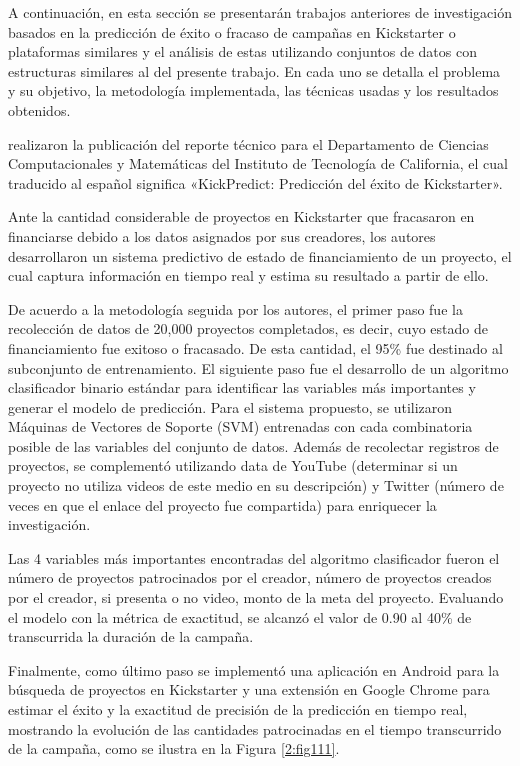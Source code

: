 A continuación, en esta sección se presentarán trabajos anteriores de investigación basados en la predicción de éxito o fracaso de campañas en Kickstarter o plataformas similares y el análisis de estas utilizando conjuntos de datos con estructuras similares al del presente trabajo. En cada uno se detalla el problema y su objetivo, la metodología implementada, las técnicas usadas y los resultados obtenidos.

\cite{pr_chen2013kickpredict} realizaron la publicación del reporte técnico  para el Departamento de Ciencias Computacionales y Matemáticas del Instituto de Tecnología de California, el cual traducido al español significa «KickPredict: Predicción del éxito de Kickstarter».

Ante la cantidad considerable de proyectos en Kickstarter que fracasaron en financiarse debido a los datos asignados por sus creadores, los autores desarrollaron un sistema predictivo de estado de financiamiento de un proyecto, el cual captura información en tiempo real y estima su resultado a partir de ello.

De acuerdo a la metodología seguida por los autores, el primer paso fue la recolección de datos de 20,000 proyectos completados, es decir, cuyo estado de financiamiento fue exitoso o fracasado. De esta cantidad, el 95\% fue destinado al subconjunto de entrenamiento. El siguiente paso fue el desarrollo de un algoritmo clasificador binario estándar para identificar las variables más importantes y generar el modelo de predicción. Para el sistema propuesto, se utilizaron Máquinas de Vectores de Soporte (SVM) entrenadas con cada combinatoria posible de las variables del conjunto de datos. Además de recolectar registros de proyectos, se complementó utilizando data de YouTube (determinar si un proyecto no utiliza videos de este medio en su descripción) y Twitter (número de veces en que el enlace del proyecto fue compartida) para enriquecer la investigación.

Las 4 variables más importantes encontradas del algoritmo clasificador fueron el número de proyectos patrocinados por el creador, número de proyectos creados por el creador, si presenta o no video, monto de la meta del proyecto. Evaluando el modelo con la métrica de exactitud, se alcanzó el valor de 0.90 al 40\% de transcurrida la duración de la campaña.

Finalmente, como último paso se implementó una aplicación en Android para la búsqueda de proyectos en Kickstarter y una extensión en Google Chrome para estimar el éxito y la exactitud de precisión de la predicción en tiempo real, mostrando la evolución de las cantidades patrocinadas en el tiempo transcurrido de la campaña, como se ilustra en la Figura \ref{2:fig111}.

